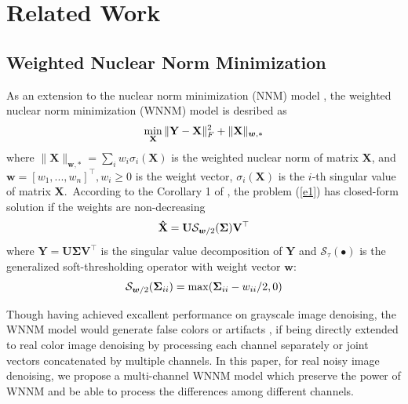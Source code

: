\documentclass[10pt,twocolumn,letterpaper,sort&compress]{article}
\begin{document}
\section{Related Work}

\subsection{Weighted Nuclear Norm Minimization}
As an extension to the nuclear norm minimization (NNM) model \cite{cai2010singular}, the weighted nuclear norm minimization (WNNM) model \cite{wnnm} is desribed as 
\vspace{-1mm}
\begin{equation}
\label{e1}
\vspace{-1mm}
\min_{\mathbf{X}}\|\mathbf{Y}-\mathbf{X}\|_{F}^{2}
+
\|\mathbf{X}\|_{\bm{w},*}
\end{equation}
where $\|\mathbf{X}\|_{\bm{w},*}=\sum_{i}w_{i}\sigma_{i}(\mathbf{X})$ is the weighted nuclear norm of matrix $\mathbf{X}$, and $\bm{w}=[w_{1},...,w_{n}]^{\top}, w_{i}\ge 0$ is the weight vector, $\sigma_{i}(\mathbf{X})$ is the $i$-th singular value of matrix $\mathbf{X}$.\ According to the Corollary 1 of \cite{wnnmijcv}, the problem (\ref{e1}) has closed-form solution if the weights are non-decreasing
\vspace{-1mm}  
\begin{equation}
\label{e2}
\vspace{-1mm}
\mathbf{\hat{X}}
=
\mathbf{U}
\mathcal{S}_{\bm{w}/2}
(\mathbf{\Sigma})
\mathbf{V}^{\top}
\end{equation}
where $\mathbf{Y}=\mathbf{U}\mathbf{\Sigma}\mathbf{V}^{\top}$ is the singular value decomposition \cite{eckart1936approximation} of $\mathbf{Y}$ and 
$\mathcal{S}_{\tau}(\bullet)$ is the generalized soft-thresholding operator with weight vector $\bm{w}$:
\vspace{-1mm}
\begin{equation}
\label{e3}
\vspace{-1mm}
\mathcal{S}_{\bm{w}/2}
(\mathbf{\Sigma}_{ii})
=
\max(\mathbf{\Sigma}_{ii}-w_{ii}/2, 0)
\end{equation}

Though having achieved excallent performance on grayscale image denoising, the WNNM model would generate false colors or artifacts \cite{mairal2008sparse}, if being directly extended to real color image denoising by processing each channel separately or joint vectors concatenated by multiple channels. In this paper, for real noisy image denoising, we propose a multi-channel WNNM model which preserve the power of WNNM and be able to process the differences among different channels.
\end{document}
